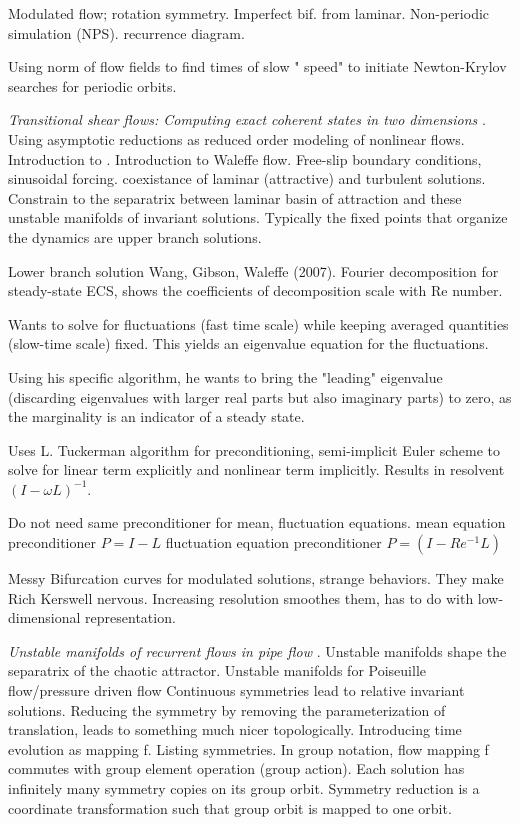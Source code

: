 \begin{description}
{\begin{description}
Modulated flow; rotation symmetry. Imperfect bif. from laminar.
Non-periodic simulation (NPS). recurrence diagram.

Using norm of flow fields to find times of slow "{\statesp} speed" to initiate
Newton-Krylov searches for periodic orbits.

\item[C. Beaume]
\textit{Transitional shear flows: Computing exact coherent states in two dimensions}
.
Using asymptotic reductions as reduced order modeling of nonlinear flows.
Introduction to \pCf.
Introduction to Waleffe flow. Free-slip boundary conditions, sinusoidal forcing.
coexistance of laminar (attractive) and turbulent solutions. Constrain to the
separatrix between laminar basin of attraction and these unstable manifolds of
invariant solutions. Typically the fixed points that organize the dynamics are
upper branch solutions.

Lower branch solution Wang, Gibson, Waleffe (2007). Fourier decomposition for
steady-state ECS, shows the coefficients of decomposition scale with Re
number.

Wants to solve for fluctuations (fast time scale) while keeping averaged quantities
(slow-time scale)
fixed. This yields an eigenvalue equation for the fluctuations.

Using his specific algorithm, he wants to bring the "leading" eigenvalue (discarding
eigenvalues with larger real parts but also imaginary parts) to zero, as the marginality
is an indicator of a steady state.

Uses L. Tuckerman algorithm for preconditioning, semi-implicit Euler scheme to solve for linear term
explicitly and nonlinear term implicitly. Results in resolvent $(I - \omega L)^{-1}$.

Do not need same preconditioner for mean, fluctuation equations.
mean equation preconditioner $P = I-L$
fluctuation equation preconditioner $P = (I - Re^{-1} L)$

Messy Bifurcation curves for modulated solutions, strange behaviors. They make Rich Kerswell nervous. Increasing
resolution smoothes them, has to do with low-dimensional representation.

\item[B. Budanur]
\textit{Unstable manifolds of recurrent flows in pipe flow}
.
Unstable manifolds shape the separatrix of the chaotic attractor.
Unstable manifolds for Poiseuille flow/pressure driven flow
Continuous symmetries lead to relative invariant solutions.
Reducing the symmetry by removing the parameterization of translation, leads to
something much nicer topologically.
Introducing time evolution as mapping f. Listing symmetries. In group notation,
flow mapping f commutes with group element operation (group action).
Each solution has infinitely many symmetry copies on its group orbit.
Symmetry reduction is a coordinate transformation such that group
orbit is mapped to one orbit.


\end{description}}
\end{description}
